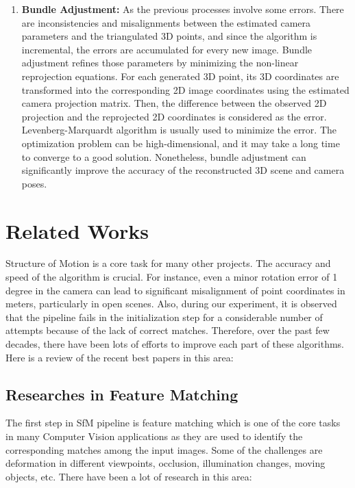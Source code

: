 \documentclass[11pt]{article}
\begin{document}
\begin{enumerate}
        \item \textbf{Bundle Adjustment:} As the previous processes involve some errors. There are inconsistencies
        and misalignments between the estimated camera parameters and the triangulated 3D points, and since the algorithm
        is incremental, the errors are accumulated for every new image. Bundle adjustment refines those parameters by
        minimizing the non-linear reprojection equations. For each generated 3D point, its 3D coordinates are
        transformed into the corresponding 2D image coordinates using the estimated camera projection matrix.
        Then, the difference between the observed 2D projection and the reprojected 2D coordinates is considered as the error.
        Levenberg-Marquardt algorithm is usually used to minimize the error.
        The optimization problem can be high-dimensional, and it may take a long time to converge to a good solution.
        Nonetheless, bundle adjustment can significantly improve the accuracy of the reconstructed 3D scene and camera poses.

    \end{enumerate}

    \section{Related Works}
    Structure of Motion is a core task for many other projects. The accuracy and speed
    of the algorithm is crucial. For instance, even a minor rotation error of 1 degree in the camera can lead
    to significant misalignment of point coordinates in meters, particularly in open scenes. Also, during our
    experiment, it is observed that the pipeline fails in the initialization step for a considerable number of attempts
    because of the lack of correct matches.
    Therefore, over the past few decades, there have been lots of efforts to improve each part of these algorithms.
    Here is a review of the recent best papers in this area:

    \subsection{Researches in Feature Matching}
    The first step in SfM pipeline is feature matching which
    is one of the core tasks in many Computer Vision applications as they are used to identify the corresponding
    matches among the input images. Some of the challenges are deformation in different viewpoints, occlusion,
    illumination changes, moving objects, etc. There have been a lot of research in this area:
\end{document}
